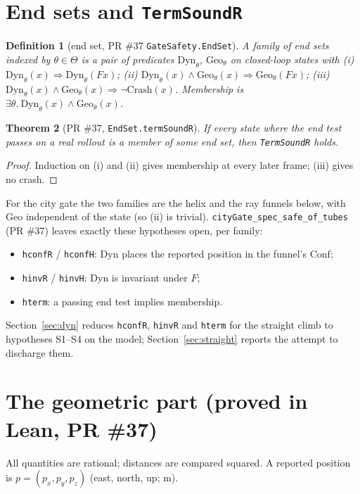 \documentclass[11pt]{article}
\newtheorem{theorem}{Theorem}
\newtheorem{definition}[theorem]{Definition}
\newcommand{\Crash}{\mathrm{Crash}}
\newcommand{\Conf}{\ensuremath{\mathrm{Conf}}}
\newcommand{\Geo}{\ensuremath{\mathrm{Geo}}}
\newcommand{\Dyn}{\ensuremath{\mathrm{Dyn}}}
\begin{document}
\section{End sets and \texttt{TermSoundR}}\label{sec:endsets}

\begin{definition}[end set, PR \#37 \texttt{GateSafety.EndSet}]
A family of end sets indexed by $\theta \in \Theta$ is a pair of predicates $\Dyn_\theta$, $\Geo_\theta$ on closed-loop states with
(i) $\Dyn_\theta(x) \Rightarrow \Dyn_\theta(F x)$; (ii) $\Dyn_\theta(x) \wedge \Geo_\theta(x) \Rightarrow \Geo_\theta(F x)$; (iii) $\Dyn_\theta(x) \wedge \Geo_\theta(x) \Rightarrow \neg\Crash(x)$. Membership is $\exists\theta.\ \Dyn_\theta(x) \wedge \Geo_\theta(x)$.
\end{definition}

\begin{theorem}[PR \#37, \texttt{EndSet.termSoundR}]\label{thm:term}
If every state where the end test passes on a real rollout is a member of some end set, then \texttt{TermSoundR} holds.
\end{theorem}
\begin{proof}
Induction on (i) and (ii) gives membership at every later frame; (iii) gives no crash.
\end{proof}

For the city gate the two families are the helix and the ray funnels below, with $\Geo$ independent of the state (so (ii) is trivial). \texttt{cityGate\_spec\_safe\_of\_tubes} (PR \#37) leaves exactly these hypotheses open, per family:
\begin{itemize}
\item \texttt{hconfR} / \texttt{hconfH}: $\Dyn$ places the reported position in the funnel's $\Conf$;
\item \texttt{hinvR} / \texttt{hinvH}: $\Dyn$ is invariant under $F$;
\item \texttt{hterm}: a passing end test implies membership.
\end{itemize}
Section~\ref{sec:dyn} reduces \texttt{hconfR}, \texttt{hinvR} and \texttt{hterm} for the straight climb to hypotheses S1--S4 on the model; Section~\ref{sec:straight} reports the attempt to discharge them.

\section{The geometric part (proved in Lean, PR \#37)}\label{sec:geo}

All quantities are rational; distances are compared squared. A reported position is $p = (p_x, p_y, p_z)$ (east, north, up; m).
\end{document}
